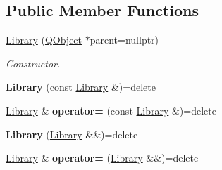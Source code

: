 \subsection*{Public Member Functions}
\begin{DoxyCompactItemize}
\item 
\hyperlink{class_mdt_1_1_deploy_utils_1_1_library_ae3d859ad862e026b00d12e50702ae4df}{Library} (\hyperlink{class_q_object}{Q\+Object} $\ast$parent=nullptr)
\begin{DoxyCompactList}\small\item\em Constructor. \end{DoxyCompactList}\item 
{\bfseries Library} (const \hyperlink{class_mdt_1_1_deploy_utils_1_1_library}{Library} \&)=delete\hypertarget{class_mdt_1_1_deploy_utils_1_1_library_a8c0856517a687937d59df6d0776a6cc8}{}\label{class_mdt_1_1_deploy_utils_1_1_library_a8c0856517a687937d59df6d0776a6cc8}

\item 
\hyperlink{class_mdt_1_1_deploy_utils_1_1_library}{Library} \& {\bfseries operator=} (const \hyperlink{class_mdt_1_1_deploy_utils_1_1_library}{Library} \&)=delete\hypertarget{class_mdt_1_1_deploy_utils_1_1_library_aa024a19c0cd43f2523ece558093a7dbb}{}\label{class_mdt_1_1_deploy_utils_1_1_library_aa024a19c0cd43f2523ece558093a7dbb}

\item 
{\bfseries Library} (\hyperlink{class_mdt_1_1_deploy_utils_1_1_library}{Library} \&\&)=delete\hypertarget{class_mdt_1_1_deploy_utils_1_1_library_ab3ef2a8f7f154733f5a79191ceaaa185}{}\label{class_mdt_1_1_deploy_utils_1_1_library_ab3ef2a8f7f154733f5a79191ceaaa185}

\item 
\hyperlink{class_mdt_1_1_deploy_utils_1_1_library}{Library} \& {\bfseries operator=} (\hyperlink{class_mdt_1_1_deploy_utils_1_1_library}{Library} \&\&)=delete\hypertarget{class_mdt_1_1_deploy_utils_1_1_library_afbe16dc9aeff2acc7964db4b447117d9}{}\label{class_mdt_1_1_deploy_utils_1_1_library_afbe16dc9aeff2acc7964db4b447117d9}


\end{DoxyCompactItemize}
